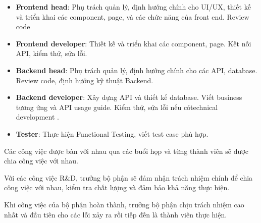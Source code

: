 \begin{itemize}
  \item \textbf{Frontend head}: Phụ trách quản lý, định hướng chính cho UI/UX, thiết kế và triển khai các component, page, và các chức năng của front end. Review code
  \item \textbf{Frontend developer}: Thiết kế và triển khai các component, page. Kết nối API, kiểm thử, sửa lỗi. 
  \item \textbf{Backend head}: Phụ trách quản lý, định hướng chính cho các API, database. Review code, định hướng kỹ thuật Backend. 
  \item \textbf{Backend developer}: Xây dựng API và thiết kế database. Viết business tương ứng và API usage guide. Kiểm thử, sửa lỗi nếu cótechnical development .
  \item \textbf{Tester}: Thực hiện Functional Testing, viết test case phù hợp.
\end{itemize}

Các công việc được bàn với nhau qua các buổi họp và từng thành viên sẽ được chia công việc với nhau.

Với các công việc R\&D, trưởng bộ phận sẽ đảm nhận trách nhiệm chính để chia công việc với nhau, kiểm tra chất lượng và đảm bảo khả năng thực hiện. 

Khi công việc của bộ phận hoàn thành, trưởng bộ phận chịu trách nhiệm cao nhất và đầu tiên cho các lỗi xảy ra rồi tiếp đến là thành viên thực hiện.
